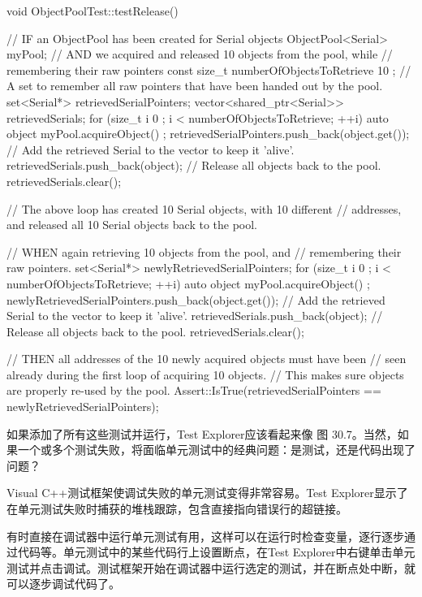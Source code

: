 \begin{cpp}
void ObjectPoolTest::testRelease()
{
    // IF an ObjectPool has been created for Serial objects
    ObjectPool<Serial> myPool;
    // AND we acquired and released 10 objects from the pool, while
    //     remembering their raw pointers
    const size_t numberOfObjectsToRetrieve { 10 };
    // A set to remember all raw pointers that have been handed out by the pool.
    set<Serial*> retrievedSerialPointers;
    vector<shared_ptr<Serial>> retrievedSerials;
    for (size_t i { 0 }; i < numberOfObjectsToRetrieve; ++i) {
        auto object { myPool.acquireObject() };
        retrievedSerialPointers.push_back(object.get());
        // Add the retrieved Serial to the vector to keep it 'alive'.
        retrievedSerials.push_back(object);
    }
    // Release all objects back to the pool.
    retrievedSerials.clear();

    // The above loop has created 10 Serial objects, with 10 different
    // addresses, and released all 10 Serial objects back to the pool.

    // WHEN again retrieving 10 objects from the pool, and
    //      remembering their raw pointers.
    set<Serial*> newlyRetrievedSerialPointers;
    for (size_t i { 0 }; i < numberOfObjectsToRetrieve; ++i) {
        auto object { myPool.acquireObject() };
        newlyRetrievedSerialPointers.push_back(object.get());
        // Add the retrieved Serial to the vector to keep it 'alive'.
        retrievedSerials.push_back(object);
    }
    // Release all objects back to the pool.
    retrievedSerials.clear();

    // THEN all addresses of the 10 newly acquired objects must have been
    //      seen already during the first loop of acquiring 10 objects.
    //      This makes sure objects are properly re-used by the pool.
    Assert::IsTrue(retrievedSerialPointers == newlyRetrievedSerialPointers);
}
\end{cpp}

如果添加了所有这些测试并运行，Test Explorer应该看起来像 图 30.7。当然，如果一个或多个测试失败，将面临单元测试中的经典问题：是测试，还是代码出现了问题？



Visual C++测试框架使调试失败的单元测试变得非常容易。Test Explorer显示了在单元测试失败时捕获的堆栈跟踪，包含直接指向错误行的超链接。

有时直接在调试器中运行单元测试有用，这样可以在运行时检查变量，逐行逐步通过代码等。单元测试中的某些代码行上设置断点，在Test Explorer中右键单击单元测试并点击调试。测试框架开始在调试器中运行选定的测试，并在断点处中断，就可以逐步调试代码了。


